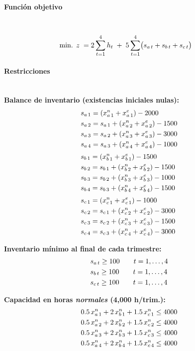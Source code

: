 \paragraph{Función objetivo}\mbox{}\\
\begin{align}
\mbox{min. } z \;=\;& 2\sum_{t=1}^{4} h_t \;+\; 5\sum_{t=1}^{4}\!\big(s_{a\,t}+s_{b\,t}+s_{c\,t}\big) \notag
\end{align}

\paragraph{Restricciones}\mbox{}\\
\textbf{Balance de inventario (existencias iniciales nulas):}
\begin{align}
& s_{a\,1} = (x^{n}_{a\,1}+x^{e}_{a\,1}) - 2000 \notag\\
& s_{a\,2} = s_{a\,1} + (x^{n}_{a\,2}+x^{e}_{a\,2}) - 1500 \notag\\
& s_{a\,3} = s_{a\,2} + (x^{n}_{a\,3}+x^{e}_{a\,3}) - 3000 \notag\\
& s_{a\,4} = s_{a\,3} + (x^{n}_{a\,4}+x^{e}_{a\,4}) - 1000 \notag\\[1mm]
& s_{b\,1} = (x^{n}_{b\,1}+x^{e}_{b\,1}) - 1500 \notag\\
& s_{b\,2} = s_{b\,1} + (x^{n}_{b\,2}+x^{e}_{b\,2}) - 1500 \notag\\
& s_{b\,3} = s_{b\,2} + (x^{n}_{b\,3}+x^{e}_{b\,3}) - 1000 \notag\\
& s_{b\,4} = s_{b\,3} + (x^{n}_{b\,4}+x^{e}_{b\,4}) - 1500 \notag\\[1mm]
& s_{c\,1} = (x^{n}_{c\,1}+x^{e}_{c\,1}) - 1000 \notag\\
& s_{c\,2} = s_{c\,1} + (x^{n}_{c\,2}+x^{e}_{c\,2}) - 3000 \notag\\
& s_{c\,3} = s_{c\,2} + (x^{n}_{c\,3}+x^{e}_{c\,3}) - 1500 \notag\\
& s_{c\,4} = s_{c\,3} + (x^{n}_{c\,4}+x^{e}_{c\,4}) - 3000 \notag
\end{align}

\textbf{Inventario mínimo al final de cada trimestre:}
\begin{align}
& s_{a\,t} \ge 100 \qquad t=1,\dots,4 \notag\\
& s_{b\,t} \ge 100 \qquad t=1,\dots,4 \notag\\
& s_{c\,t} \ge 100 \qquad t=1,\dots,4 \notag
\end{align}

\textbf{Capacidad en horas \emph{normales} (4{,}000 h/trim.):}
\begin{align}
& 0.5\,x^{n}_{a\,1} + 2\,x^{n}_{b\,1} + 1.5\,x^{n}_{c\,1} \le 4000 \notag\\
& 0.5\,x^{n}_{a\,2} + 2\,x^{n}_{b\,2} + 1.5\,x^{n}_{c\,2} \le 4000 \notag\\
& 0.5\,x^{n}_{a\,3} + 2\,x^{n}_{b\,3} + 1.5\,x^{n}_{c\,3} \le 4000 \notag\\
& 0.5\,x^{n}_{a\,4} + 2\,x^{n}_{b\,4} + 1.5\,x^{n}_{c\,4} \le 4000 \notag
\end{align}

